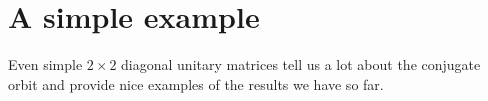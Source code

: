 \documentclass{dis}
\theoremstyle{plain}
\newtheorem{Proposition}[equation]{Proposition}
\theoremstyle{definition}
\newcommand{\0}{{\color{lightgray}0}}
\begin{document}


\section{A simple example}

Even simple $2 \times 2$ diagonal unitary matrices tell us a lot about the conjugate orbit and provide nice examples of the results we have so far. 
\end{document}
